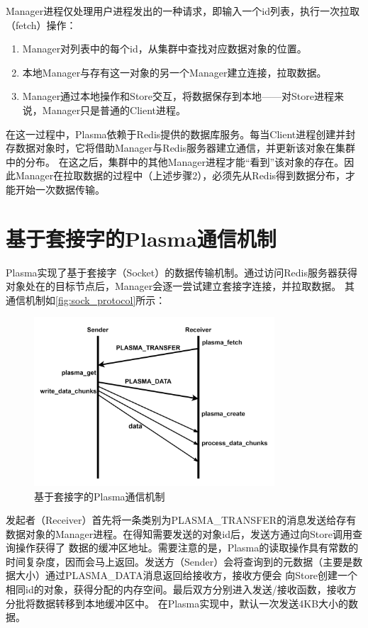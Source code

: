 Manager进程仅处理用户进程发出的一种请求，即输入一个id列表，执行一次拉取（fetch）操作：

\begin{enumerate}
    \item Manager对列表中的每个id，从集群中查找对应数据对象的位置。 
    \item 本地Manager与存有这一对象的另一个Manager建立连接，拉取数据。
    \item Manager通过本地操作和Store交互，将数据保存到本地——对Store进程来说，Manager只是普通的Client进程。
\end{enumerate}

在这一过程中，Plasma依赖于Redis提供的数据库服务。每当Client进程创建并封存数据对象时，它将借助Manager与Redis服务器建立通信，并更新该对象在集群中的分布。
在这之后，集群中的其他Manager进程才能“看到”该对象的存在。因此Manager在拉取数据的过程中（上述步骤2），必须先从Redis得到数据分布，才能开始一次数据传输。

\section{基于套接字的Plasma通信机制}

Plasma实现了基于套接字（Socket）的数据传输机制。通过访问Redis服务器获得对象处在的目标节点后，Manager会逐一尝试建立套接字连接，并拉取数据。
其通信机制如\autoref{fig:sock_protocol}所示：

\begin{figure}[h] 
    \centering
    \includegraphics[width=0.8\textwidth]{image/chap02/sock_protocol.png}
    \caption{基于套接字的Plasma通信机制}
    \label{fig:sock_protocol}
\end{figure}

发起者（Receiver）首先将一条类别为PLASMA\_TRANSFER的消息发送给存有数据对象的Manager进程。在得知需要发送的对象id后，发送方通过向Store调用查询操作获得了
数据的缓冲区地址。需要注意的是，Plasma的读取操作具有常数的时间复杂度，因而会马上返回。发送方（Sender）会将查询到的元数据（主要是数据大小）通过PLASMA\_DATA消息返回给接收方，接收方便会
向Store创建一个相同id的对象，获得分配的内存空间。最后双方分别进入发送/接收函数，接收方分批将数据转移到本地缓冲区中。
在Plasma实现中，默认一次发送4KB大小的数据。

